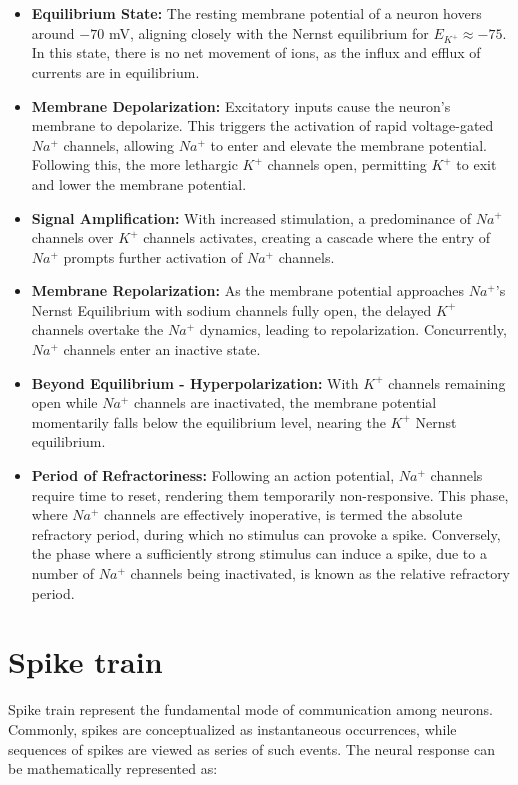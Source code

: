 \documentclass[12pt,a4paper]{report}
\begin{document}
\begin{itemize}
    \item \textbf{Equilibrium State:} The resting membrane potential of a neuron hovers around \(-70\) mV, aligning closely with the Nernst equilibrium for \( E_{K^+} \approx -75 \). In this state, there is no net movement of ions, as the influx and efflux of currents are in equilibrium.
    \item \textbf{Membrane Depolarization:} Excitatory inputs cause the neuron's membrane to depolarize. This triggers the activation of rapid voltage-gated \( Na^+ \) channels, allowing \( Na^+ \) to enter and elevate the membrane potential. Following this, the more lethargic \( K^+ \) channels open, permitting \( K^+ \) to exit and lower the membrane potential.
    \item \textbf{Signal Amplification:} With increased stimulation, a predominance of \( Na^+ \) channels over \( K^+ \) channels activates, creating a cascade where the entry of \( Na^+ \) prompts further activation of \( Na^+ \) channels.
    \item \textbf{Membrane Repolarization:} As the membrane potential approaches \( Na^+ \)'s Nernst Equilibrium with sodium channels fully open, the delayed \( K^+ \) channels overtake the \( Na^+ \) dynamics, leading to repolarization. Concurrently, \( Na^+ \) channels enter an inactive state.
    \item \textbf{Beyond Equilibrium - Hyperpolarization:} With \( K^+ \) channels remaining open while \( Na^+ \) channels are inactivated, the membrane potential momentarily falls below the equilibrium level, nearing the \( K^+ \) Nernst equilibrium.
    \item \textbf{Period of Refractoriness:} Following an action potential, \( Na^+ \) channels require time to reset, rendering them temporarily non-responsive. This phase, where \( Na^+ \) channels are effectively inoperative, is termed the absolute refractory period, during which no stimulus can provoke a spike. Conversely, the phase where a sufficiently strong stimulus can induce a spike, due to a number of \( Na^+ \) channels being inactivated, is known as the relative refractory period.
\end{itemize}


\section{Spike train}

Spike train represent the fundamental mode of communication among neurons. Commonly, spikes are conceptualized as instantaneous occurrences, while sequences of spikes are viewed as series of such events. The neural response can be mathematically represented as:
\end{document}
